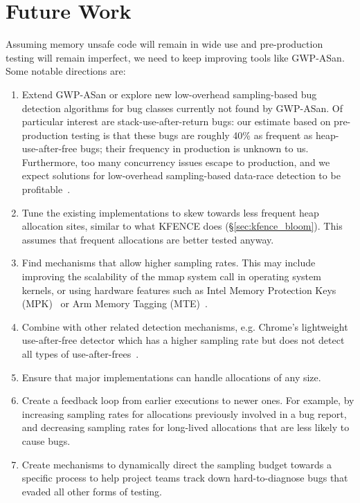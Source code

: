 \section{Future Work}
\label{sec:future}

Assuming memory unsafe code will remain in wide use and pre-production testing
will remain imperfect, we need to keep improving tools like GWP-ASan. Some
notable directions are:

\begin{enumerate}

  \item Extend GWP-ASan or explore new low-overhead sampling-based bug
    detection algorithms for bug classes currently not found by GWP-ASan. Of
    particular interest are stack-use-after-return bugs: our estimate based on
    pre-production testing is that these bugs are roughly 40\% as frequent as
    heap-use-after-free bugs; their frequency in production is unknown to us.
    Furthermore, too many concurrency issues escape to production, and we
    expect solutions for low-overhead sampling-based data-race detection to be
    profitable~\cite{GWPTsan}.

  \item Tune the existing implementations to skew towards less frequent heap
    allocation sites, similar to what KFENCE does (\S\ref{sec:kfence_bloom}).
    This assumes that frequent allocations are better tested anyway.

  \item Find mechanisms that allow higher sampling rates. This may include
    improving the scalability of the mmap system call in operating system
    kernels, or using hardware features such as Intel Memory Protection Keys
    (MPK)~\cite{PKU} or Arm Memory Tagging (MTE)~\cite{Serebryany2019}.

  \item Combine with other related detection mechanisms, e.g. Chrome's
    lightweight use-after-free detector which has a higher sampling rate but
    does not detect all types of use-after-frees~\cite{LightweightUafDetector}.

  \item Ensure that major implementations can handle allocations of any size.

  \item Create a feedback loop from earlier executions to newer ones. For
    example, by increasing sampling rates for allocations previously involved
    in a bug report, and decreasing sampling rates for long-lived allocations
    that are less likely to cause bugs.

  \item Create mechanisms to dynamically direct the sampling budget towards a
    specific process to help project teams track down hard-to-diagnose bugs
    that evaded all other forms of testing.

\end{enumerate}
